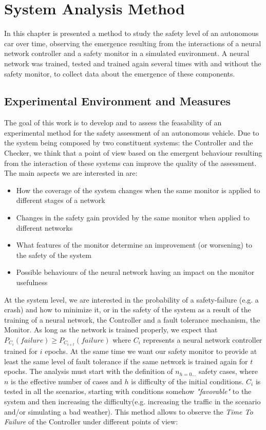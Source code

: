 \chapter{System Analysis Method}

In this chapter is presented a method to study the safety level of an autonomous car over time, observing the emergence resulting from the interactions of a neural network controller and a safety monitor in a simulated environment.\newline
A neural network was trained, tested and trained again several times with and without the safety monitor, to collect data about the emergence of these components.

\section{Experimental Environment and Measures}

The goal of this work is to develop and to assess the feasability of an experimental method for the safety assessment of an autonomous vehicle. Due to the system being composed by two constituent systems: the Controller and the Checker, we think that a point of view based on the emergent behaviour resulting from the interaction of these systems can improve the quality of the assessment.\newline
The main aspects we are interested in are:

\begin{itemize}
	\item How the coverage of the system changes when the same monitor is applied to different stages of a network
	\item Changes in the safety gain provided by the same monitor when applied to different networks
	\item What features of the monitor determine an improvement (or worsening) to the safety of the system
	\item Possible behaviours of the neural network having an impact on the monitor usefulness
\end{itemize}

At the system level, we are interested in the probability of a safety-failure (e.g. a crash) and how to minimize it, or in the safety of the system as a result of the training of a neural network, the Controller and a fault tolerance mechanism, the Monitor. As long as the network is trained properly, we expect that $P_{C_{i}}(failure) \geq P_{C_{i+t}}(failure)$ where $C_{i}$ represents a neural network controller trained for $i$ epochs. At the same time we want our safety monitor to provide at least the same level of fault tolerance if the same network is trained again for $t$ epochs.\newline
The analysis must start with the definition of $n_{h=0\dots}$ safety cases, where $n$ is the effective number of cases and $h$ is difficulty of the initial conditions. $C_{i}$ is tested in all the scenarios, starting with conditions somehow \textsl{"favorable"} to the system and then increasing the difficulty(e.g. increasing the traffic in the scenario and/or simulating a bad weather). This method allows to observe the \textsl{Time To Failure} of the Controller under different points of view:

